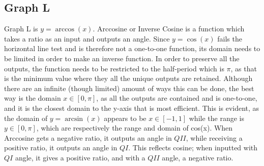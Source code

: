 \subsection{Graph L}

Graph L is ${y=\arccos(x)}$.
Arccosine or Inverse Cosine is a function which takes a ratio as an input and outputs an angle.
Since ${y=\cos(x)}$ fails the horizontal line test and is therefore not a one-to-one function, its domain needs to be limited in order to make an inverse function.
In order to preserve all the outputs, the function needs to be restricted to the half-period which is ${\pi}$, as that is the minimum value where they all the unique outputs are retained.
Although there are an infinite (though limited) amount of ways this can be done, the best way is the domain ${x \in {[{0}, {\pi}]}}$, as all the outputs are contained and is one-to-one, and it is the closest domain to the y-axis that is most efficient.
This is evident, as the domain of ${y=\arcsin(x)}$ appears to be ${x \in {[{-1}, {1}]}}$ while the range is ${y \in {[{0}, {\pi}]}}$, which are respectively the range and domain of cos(x).
When Arccosine gets a negative ratio, it outputs an angle in $QII$, while receiving a positive ratio, it outputs an angle in $QI$.
This reflects cosine; when inputted with $QI$ angle, it gives a positive ratio, and with a $QII$ angle, a negative ratio.
